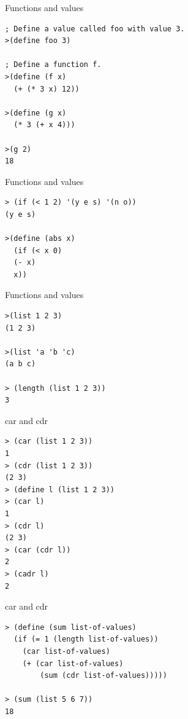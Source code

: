 \begin{frame}[fragile]{Functions and values}
\begin{verbatim}
; Define a value called foo with value 3.
>(define foo 3)

; Define a function f.	
>(define (f x)
  (+ (* 3 x) 12))

>(define (g x)
  (* 3 (+ x 4)))

>(g 2)
18
\end{verbatim}
\end{frame}

\begin{frame}[fragile]{Functions and values}
  \begin{verbatim}
> (if (< 1 2) '(y e s) '(n o))
(y e s)

>(define (abs x)
  (if (< x 0)
  (- x)
  x))

\end{verbatim}
\end{frame}


\begin{frame}[fragile]{Functions and values}
  \begin{verbatim}
>(list 1 2 3)
(1 2 3)

>(list 'a 'b 'c)
(a b c)

> (length (list 1 2 3))
3
\end{verbatim}
\end{frame}

\begin{frame}[fragile]{car and cdr}
  \begin{verbatim}
> (car (list 1 2 3))
1
> (cdr (list 1 2 3))
(2 3)
> (define l (list 1 2 3))
> (car l)
1
> (cdr l)
(2 3)
> (car (cdr l))
2
> (cadr l)
2
\end{verbatim}
\end{frame}

\begin{frame}[fragile]{car and cdr}
  \begin{verbatim}
> (define (sum list-of-values)
  (if (= 1 (length list-of-values))
    (car list-of-values)
    (+ (car list-of-values)
        (sum (cdr list-of-values)))))

> (sum (list 5 6 7))
18
\end{verbatim}
\end{frame}

